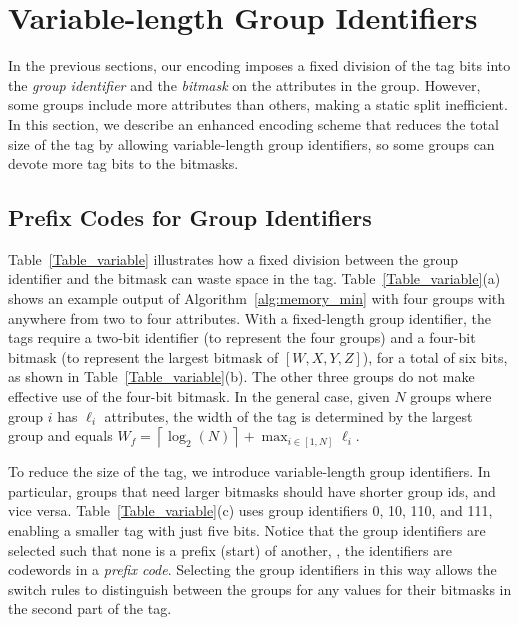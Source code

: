 \section{Variable-length Group Identifiers}
\label{sec:identifiers}
In the previous sections, our encoding imposes a fixed division of the
tag bits into the \emph{group identifier} and the \emph{bitmask} on
the attributes in the group.  However, some groups include more
attributes than others, making a static split inefficient. In this
section, we describe an enhanced encoding scheme that reduces the
total size of the tag by allowing variable-length group identifiers,
so some groups can devote more tag bits to the bitmasks.

\subsection{Prefix Codes for Group Identifiers}
Table~\ref{Table_variable} illustrates how a fixed division between
the group identifier and the bitmask can waste space in the tag.
Table~\ref{Table_variable}(a) shows an example output of
Algorithm~\ref{alg:memory_min} with four groups with anywhere from two
to four attributes.  With a fixed-length group identifier, the tags
require a two-bit identifier (to represent the four groups) and a
four-bit bitmask (to represent the largest bitmask of $[W,X,Y,Z]$),
for a total of six bits, as shown in Table~\ref{Table_variable}(b).
The other three groups do not make effective use of the four-bit
bitmask.  In the general case, given $N$ groups where group $i$ has
$\ell_i$ attributes, the width of the tag is determined by the largest
group and equals $W_{f} = \left \lceil \log_2(N) \right \rceil +
\max_{i \in [1,N]} \ell_i$.

To reduce the size of the tag, we introduce variable-length group
identifiers.  In particular, groups that need larger bitmasks should
have shorter group ids, and vice versa.  Table~\ref{Table_variable}(c)
uses group identifiers 0, 10, 110, and 111, enabling a smaller tag with
just five bits.  Notice that the group identifiers are selected such
that none is a prefix (start) of another, \ie, the identifiers are
codewords in a \emph{prefix code}.  Selecting the group identifiers in
this way allows the switch rules to distinguish between the groups
for any values for their bitmasks in the second part of the tag.

%
%

